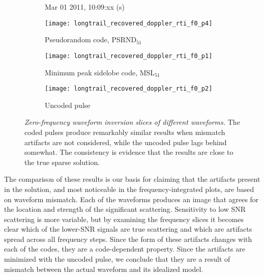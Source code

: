 \begin{figure}[tpb]
 \vspace{-1.5\baselineskip}
 \begin{subfigure}{\textwidth}
  \centering
  \textsf{\footnotesize Mar 01 2011, 10:09:xx (s)}
  
  \texttt{[image: longtrail\_recovered\_doppler\_rti\_f0\_p4]}
  \caption{Pseudorandom code, PSRND$_\text{51}$}
  \label{fig:longtrail_psrnd_doppler0}
 \end{subfigure}
 
 \vspace{0.5\baselineskip}
 \begin{subfigure}{\textwidth}
  \centering
  \texttt{[image: longtrail\_recovered\_doppler\_rti\_f0\_p1]}
  \caption{Minimum peak sidelobe code, MSL$_\text{51}$}
  \label{fig:longtrail_msl_doppler0}
 \end{subfigure}
 
 \vspace{0.5\baselineskip}
 \begin{subfigure}{\textwidth}
  \centering
  \texttt{[image: longtrail\_recovered\_doppler\_rti\_f0\_p2]}
  \caption{Uncoded pulse}
  \label{fig:longtrail_unc_doppler0}
 \end{subfigure}
 \caption[Zero-frequency waveform inversion slices of different waveforms]{\emph{Zero-frequency waveform inversion slices of different waveforms.} The coded pulses produce remarkably similar results when mismatch artifacts are not considered, while the uncoded pulse lags behind somewhat. The consistency is evidence that the results are close to the true sparse solution.}
 \label{fig:waveform_comparison_doppler0}
\end{figure}%
The comparison of these results is our basis for claiming that the artifacts present in the solution, and most noticeable in the frequency-integrated plots, are based on waveform mismatch. Each of the waveforms produces an image that agrees for the location and strength of the significant scattering. Sensitivity to low SNR scattering is more variable, but by examining the frequency slices it becomes clear which of the lower-SNR signals are true scattering and which are artifacts spread across all frequency steps. Since the form of these artifacts changes with each of the codes, they are a code-dependent property. Since the artifacts are minimized with the uncoded pulse, we conclude that they are a result of mismatch between the actual waveform and its idealized model.

